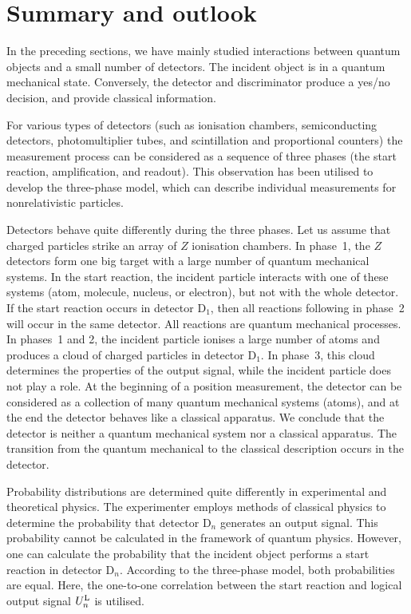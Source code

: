 \documentclass[12pt]{article}
\begin{document}

\section{Summary and outlook}   

In the preceding sections, we have mainly studied interactions between quantum objects and a small number of detectors.  
The incident object is in a quantum mechanical state.  
Conversely, the detector and discriminator produce a yes/no decision, and provide classical information.  

For various types of detectors (such as ionisation chambers, semiconducting detectors, photomultiplier tubes, and scintillation and proportional counters) the measurement process can be considered as a sequence of three phases (the start reaction, amplification, and readout).  
This observation has been utilised to develop the three-phase model, which can describe individual measurements for nonrelativistic particles.  

Detectors behave quite differently during the three phases.  Let us assume that charged particles strike an array of $Z$ ionisation chambers.  
In phase~1, the $Z$ detectors form one big target with a large number of quantum mechanical systems.  
In the start reaction, the incident particle interacts with one of these systems (atom, molecule, nucleus, or electron), but not with the whole detector.  
If the start reaction occurs in detector D$_1$, then all reactions following in phase~2 will occur in the same detector.  
All reactions are quantum mechanical processes.  
In phases~1 and 2, the incident particle ionises a large number of atoms and produces a cloud of charged particles in detector D$_1$.  In phase~3, this cloud determines the properties of the output signal, while the incident particle does not play a role.  
At the beginning of a position measurement, the detector can be considered as a collection of many quantum mechanical systems (atoms), and at the end the detector behaves like a classical apparatus.  
We conclude that the detector is neither a quantum mechanical system nor a classical apparatus.  The transition from the quantum mechanical to the classical description occurs in the detector.  

Probability distributions are determined quite differently in experimental and theoretical physics.  The experimenter employs methods of classical physics to determine the probability that detector D$_n$ generates an output signal.  
This probability cannot be calculated in the framework of quantum physics.  
However, one can calculate the probability that the incident object performs a start reaction in detector D$_n$.  
According to the three-phase model, both probabilities are equal.  
Here, the one-to-one correlation between the start reaction and logical output signal $U_n^{\rm L}$ is utilised.  
\end{document}
